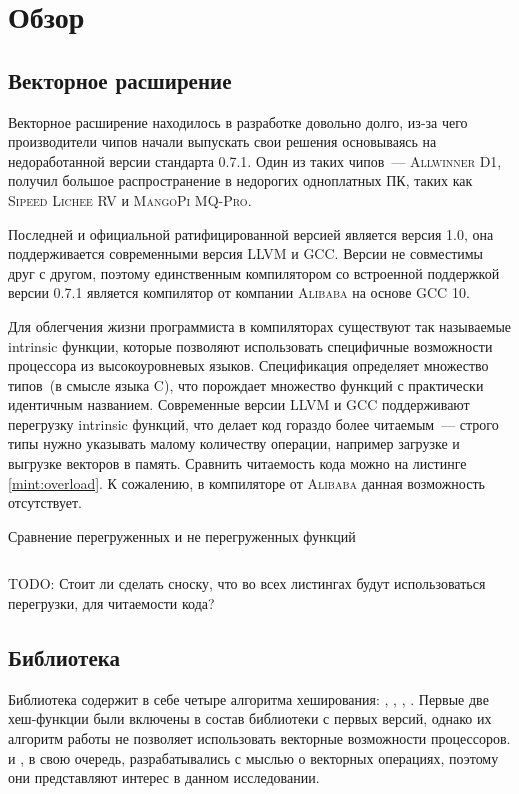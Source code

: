 
\section{Обзор}
\label{sec:relatedworks}
\subsection[Векторное расширение RISC-V]{Векторное расширение \riscv{}}
Векторное расширение \riscv{} находилось в разработке довольно долго, из-за чего производители чипов начали выпускать свои решения основываясь на недоработанной версии стандарта 0.7.1.
Один из таких чипов~--- \textsc{Allwinner D1}, получил большое распространение в недорогих одноплатных ПК, таких как \textsc{Sipeed Lichee RV} и \textsc{MangoPi MQ-Pro}.

Последней и официальной ратифицированной версией является версия 1.0, она поддерживается современными версия \textsc{LLVM} и \textsc{GCC}.
Версии не совместимы друг с другом, поэтому единственным компилятором со встроенной поддержкой \rvv{} версии 0.7.1 является компилятор от компании \textsc{Alibaba} на основе \textsc{GCC 10}.

Для облегчения жизни программиста в компиляторах существуют так называемые intrinsic функции, которые позволяют использовать специфичные возможности процессора из высокоуровневых языков.
Спецификация \rvv{} определяет множество типов~(в смысле языка \textsc{C}), что порождает множество функций с практически идентичным названием.
Современные версии \textsc{LLVM} и \textsc{GCC} поддерживают перегрузку intrinsic функций, что делает код гораздо более читаемым~--- строго типы нужно указывать малому количеству операции, например загрузке и выгрузке векторов в память.
Сравнить читаемость кода можно на листинге \ref{mint:overload}.
К сожалению, в компиляторе от \textsc{Alibaba} данная возможность отсутствует.
\begin{listing}
	\caption{Сравнение перегруженных и не перегруженных функций}
	\label{mint:overload}
	\inputminted[breaklines, frame=single]{c}{figures/generic.c}
\end{listing}
TODO: Стоит ли сделать сноску, что во всех листингах будут использоваться перегрузки, для читаемости кода?
\subsection[Библиотека xxHash]{Библиотека \xxHash{}}
Библиотека содержит в себе четыре алгоритма хеширования: , , , .
Первые две хеш-функции были включены в состав библиотеки с первых версий, однако их алгоритм работы не позволяет использовать векторные возможности процессоров.
 и , в свою очередь, разрабатывались с мыслью о векторных операциях, поэтому они представляют интерес в данном исследовании.


